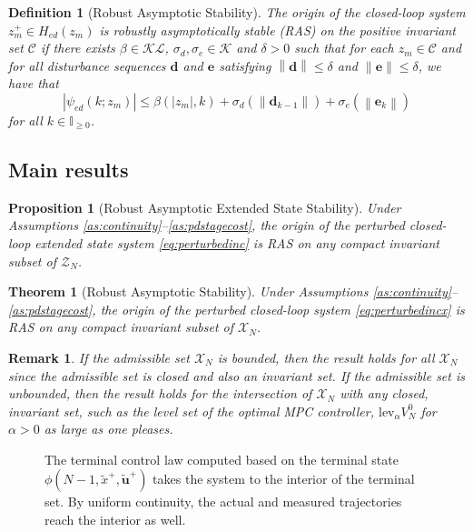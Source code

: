 \documentclass{article}
\newtheorem{theorem}{Theorem}
\newtheorem{definition}{Definition}
\newtheorem{proposition}{Proposition}
\newtheorem{remark}{Remark}
\newcommand{\abs}[1]{\left\lvert #1 \right\rvert}
\newcommand{\norm}[1]{\left\lVert #1 \right\rVert}
\newcommand{\lev}{\text{lev}}
\begin{document}
\begin{definition}[Robust Asymptotic Stability]
\label{def:ras}
The origin of the closed-loop system $z_m^+ \in H_{ed}(z_m)$ is robustly asymptotically stable
(RAS) on the positive invariant set $\mathcal{C}$
if there exists $\beta \in \mathcal{KL}$, $\sigma_d,\sigma_e \in \mathcal{K}$ and $\delta > 0$ such that
for each $z_m \in \mathcal{C}$
and for all disturbance sequences $\mathbf{d}$ and $\mathbf{e}$
satisfying $\norm{\mathbf{d}} \leq \delta$ and $\norm{\mathbf{e}} \leq \delta$, we have that
\begin{equation}
\label{eq:ras}
\abs{\psi_{ed}(k;z_m)} \leq \beta(\abs{z_m},k) + \sigma_d(\norm{
\mathbf{d}_{k-1}})+ \sigma_e(\norm{\mathbf{e}_k})
\end{equation}
for all $k \in \mathbb{I}_{\geq 0}$.
\end{definition}

\subsection{Main results}
\begin{proposition}[Robust Asymptotic Extended State Stability]
\label{prop:mainiss}
Under Assumptions \ref{as:continuity}--\ref{as:pdstagecost}, 
the origin of the perturbed closed-loop extended state system 
\eqref{eq:perturbedinc} is RAS on any compact invariant subset of $\mathcal{Z}_N$.
\end{proposition}
\begin{theorem}[Robust Asymptotic Stability]
\label{th:mainiss}
Under Assumptions \ref{as:continuity}--\ref{as:pdstagecost}, 
the origin of the perturbed closed-loop system 
\eqref{eq:perturbedincx} is RAS on any compact invariant subset of $\mathcal{X}_N$.
\end{theorem}
\begin{remark}
If the admissible set $\mathcal{X}_N$ is \textit{bounded}, then the
result holds for all $\mathcal{X}_N$ since the admissible set is closed and also an
invariant set. If the admissible set is unbounded,
then the result holds for the intersection of $\mathcal{X}_N$ with any
closed, invariant set, such as the level set of the optimal MPC
controller, $\lev_{\alpha}V_N^0$ for $\alpha > 0$ as large as one pleases.
\end{remark}
\begin{figure}
\scalebox{.6}{}
\caption{The terminal control law computed based on the terminal state $\phi(N-1,\tilde{x}^+,\tilde{\mathbf{u}}^+)$ takes the system
to the interior of the terminal set. By uniform continuity, the actual and measured trajectories reach the interior as well.}
\label{fig:feasibility}
\end{figure} 
\end{document}
